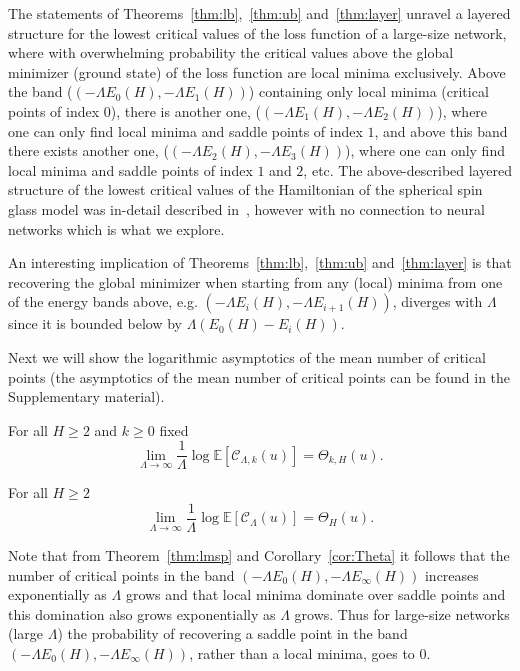 \documentclass[twoside]{article}
\begin{document}
The statements of Theorems~\ref{thm:lb},~\ref{thm:ub} and~\ref{thm:layer} unravel a layered structure for the lowest critical values of the loss function of a large-size network, where with overwhelming probability the critical values above the global minimizer (ground state) of the loss function are local minima exclusively. Above the band ($\left(-\Lambda E_0(H),-\Lambda E_1(H)\right)$) containing only local minima (critical points of index $0$), there is another one, ($\left(-\Lambda E_1(H),-\Lambda E_2(H)\right)$), where one can only find local minima and saddle points of index $1$, and above this band there exists another one, ($\left(-\Lambda E_2(H),-\Lambda E_3(H)\right)$), where one can only find local minima and saddle points of index $1$ and $2$, etc. The above-described layered structure of the lowest critical values of the Hamiltonian of the spherical spin glass model was in-detail described in~\cite{AAC2010}, however with no connection to neural networks which is what we explore. 

An interesting implication of Theorems~\ref{thm:lb},~\ref{thm:ub} and~\ref{thm:layer} is that recovering the global minimizer when starting from any (local) minima from one of the energy bands above, e.g. $\left(-\Lambda E_i(H),-\Lambda E_{i+1}(H)\right)$, diverges with $\Lambda$ since it is bounded below by $\Lambda (E_0(H) - E_i(H))$. 

Next we will show the logarithmic asymptotics of the mean number of critical points (the asymptotics of the mean number of critical points can be found in the Supplementary material).
\begin{theorem}
For all $H \geq 2$ and $k \geq 0$ fixed
\[\lim_{\Lambda \rightarrow \infty}\frac{1}{\Lambda}\log\mathbb{E}[\mathcal{C}_{\Lambda,k}(u)] = \Theta_{k,H}(u).
\]
\label{thm:lmsp}
\end{theorem}
\begin{theorem}
For all $H \geq 2$
\[\lim_{\Lambda \rightarrow \infty}\frac{1}{\Lambda}\log\mathbb{E}[\mathcal{C}_{\Lambda}(u)] = \Theta_{H}(u).
\]
\label{thm:cp}
\end{theorem}
Note that from Theorem~\ref{thm:lmsp} and Corollary~\ref{cor:Theta} it follows that the number of critical points in the band $\left(-\Lambda E_0(H),-\Lambda E_{\infty}(H)\right)$ increases exponentially as $\Lambda$ grows and that local minima dominate over saddle points and this domination also grows exponentially as $\Lambda$ grows. Thus for large-size networks (large $\Lambda$) the probability of recovering a saddle point in the band $\left(-\Lambda E_0(H),-\Lambda E_{\infty}(H)\right)$, rather than a local minima, goes to $0$.
\end{document}
